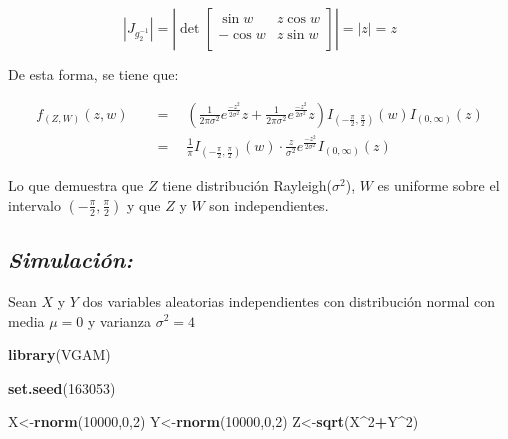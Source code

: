 \documentclass[]{article}
\newenvironment{Shaded}{\begin{snugshade}}{\end{snugshade}}
\newcommand{\KeywordTok}[1]{\textcolor[rgb]{0.13,0.29,0.53}{\textbf{#1}}}
\newcommand{\DecValTok}[1]{\textcolor[rgb]{0.00,0.00,0.81}{#1}}
\newcommand{\OperatorTok}[1]{\textcolor[rgb]{0.81,0.36,0.00}{\textbf{#1}}}
\newcommand{\NormalTok}[1]{#1}
\begin{document}
\begin{equation}
\left| J_{g_2^{-1}}  \right|
=\left| \det 
\begin{bmatrix} 
\sin w &  z\cos w \\
-\cos w &  z\sin w \\
\end{bmatrix}  \right|
=|z|=z
\end{equation}

De esta forma, se tiene que:

\begin{equation}
\begin{split}
f_{(Z,W)}(z,w) \quad &= \quad \left( \frac{1}{2\pi\sigma^2}e^{\frac{-z^2}{2\sigma^2}}z + \frac{1}{2\pi\sigma^2}e^{\frac{-z^2}{2\sigma^2}}z \right) I_{\left(-\frac{\pi}{2},\frac{\pi}{2}\right)}(w) I_{(0,\infty)}(z)\\
&=\quad \frac{1}{\pi}I_{\left(-\frac{\pi}{2},\frac{\pi}{2}\right)}(w)
\cdot\frac{z}{\sigma^2}e^{\frac{-z^2}{2\sigma^2}} I_{(0,\infty)}(z)
\end{split}
\end{equation}

Lo que demuestra que \(Z\) tiene distribución Rayleigh(\(\sigma^2\)),
\(W\) es uniforme sobre el intervalo
\(\left( -\frac{\pi}{2},\frac{\pi}{2} \right)\) y que \(Z\) y \(W\) son
independientes.

\subsection{\texorpdfstring{\emph{Simulación:}}{Simulación:}}\label{simulacion-1}

Sean \(X\) y \(Y\) dos variables aleatorias independientes con
distribución normal con media \(\mu=0\) y varianza \(\sigma^2=4\)

\begin{Shaded}
\begin{Highlighting}[]
\KeywordTok{library}\NormalTok{(VGAM)}

\KeywordTok{set.seed}\NormalTok{(}\DecValTok{163053}\NormalTok{)}

\NormalTok{X<-}\KeywordTok{rnorm}\NormalTok{(}\DecValTok{10000}\NormalTok{,}\DecValTok{0}\NormalTok{,}\DecValTok{2}\NormalTok{)}
\NormalTok{Y<-}\KeywordTok{rnorm}\NormalTok{(}\DecValTok{10000}\NormalTok{,}\DecValTok{0}\NormalTok{,}\DecValTok{2}\NormalTok{)}
\NormalTok{Z<-}\KeywordTok{sqrt}\NormalTok{(X}\OperatorTok{^}\DecValTok{2}\OperatorTok{+}\NormalTok{Y}\OperatorTok{^}\DecValTok{2}\NormalTok{)}
\end{Highlighting}
\end{Shaded}
\end{document}

